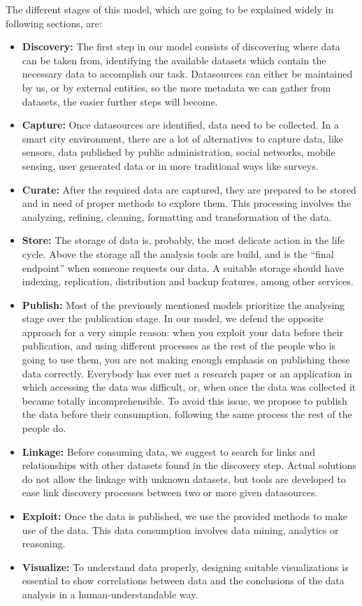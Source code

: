 The different stages of this model, which are going to be explained widely in following sections, are:
\begin{itemize}
	\item \textbf{Discovery:} The first step in our model consists of discovering where data can be taken from, identifying the available datasets which contain the necessary data to accomplish our task. Datasources can either be maintained by us, or by external entities, so the more metadata we can gather from datasets, the easier further steps will become.
    \item \textbf{Capture:} Once datasources are identified, data need to be collected. In a smart city environment, there are a lot of alternatives to capture data, like sensors, data published by public administration, social networks, mobile sensing, user generated data or in more traditional ways like surveys.
    \item \textbf{Curate:} After the required data are captured, they are prepared to be stored and in need of proper methods to explore them. This processing involves the analyzing, refining, cleaning, formatting and transformation of the data.
    \item \textbf{Store:} The storage of data is, probably, the most delicate action in the life cycle. Above the storage  all the analysis tools are build, and is the ``final endpoint'' when someone requests our data. A suitable storage should have indexing, replication, distribution and backup features, among other services.
    \item \textbf{Publish:} Most of the previously mentioned models prioritize the analysing stage over the publication stage. In our model, we defend the opposite approach for a very simple reason: when you exploit your data before their publication, and using different processes as the rest of the people who is going to use them, you are not making enough emphasis on publishing these data correctly. Everybody has ever met a research paper or an application in which accessing the data was difficult, or, when once the data was collected it became totally incomprehensible. To avoid this issue, we propose to publish the data before their consumption, following the same process the rest of the people do.
    \item \textbf{Linkage:} Before consuming data, we suggest to search for links and relationships with other datasets found in the discovery step. Actual solutions do not allow the linkage with unknown datasets, but tools are developed to ease link discovery processes between two or more given datasources.
    \item \textbf{Exploit:} Once the data is published, we use the provided methods to make use of the data. This data consumption involves data mining, analytics or reasoning.
    \item \textbf{Visualize:} To understand data properly, designing suitable visualizations is essential to show correlations between data and the conclusions of the data analysis in a human-understandable way.
    
\end{itemize}

